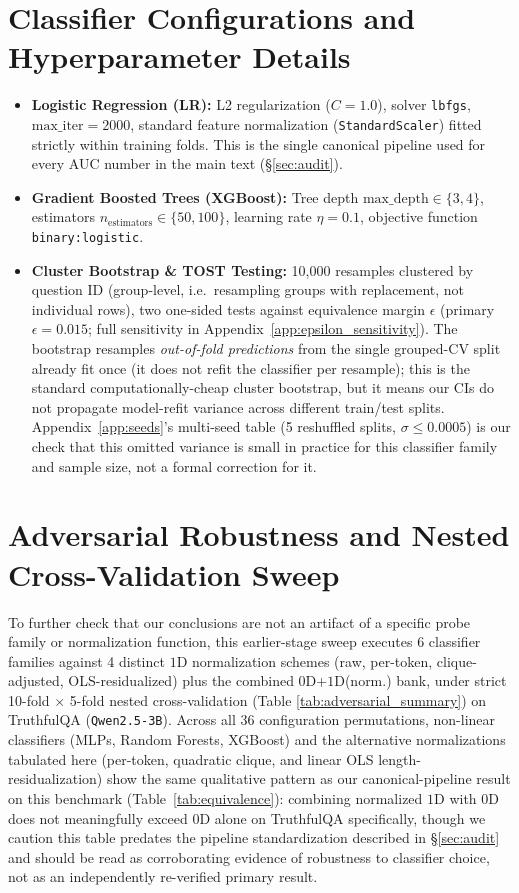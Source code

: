 \documentclass{article}
\begin{document}
\section{Classifier Configurations and Hyperparameter Details}
\label{app:hyperparams}
\begin{itemize}
    \item \textbf{Logistic Regression (LR):} L2 regularization ($C = 1.0$), solver \texttt{lbfgs}, $\text{max\_iter} = 2000$, standard feature normalization (\texttt{StandardScaler}) fitted strictly within training folds. This is the single canonical pipeline used for every AUC number in the main text (\S\ref{sec:audit}).
    \item \textbf{Gradient Boosted Trees (XGBoost):} Tree depth $\text{max\_depth} \in \{3, 4\}$, estimators $n_{\text{estimators}} \in \{50, 100\}$, learning rate $\eta = 0.1$, objective function \texttt{binary:logistic}.
    \item \textbf{Cluster Bootstrap \& TOST Testing:} 10,000 resamples clustered by question ID (group-level, i.e.\ resampling groups with replacement, not individual rows), two one-sided tests against equivalence margin $\epsilon$ (primary $\epsilon=0.015$; full sensitivity in Appendix~\ref{app:epsilon_sensitivity}). The bootstrap resamples \emph{out-of-fold predictions} from the single grouped-CV split already fit once (it does not refit the classifier per resample); this is the standard computationally-cheap cluster bootstrap, but it means our CIs do not propagate model-refit variance across different train/test splits. Appendix~\ref{app:seeds}'s multi-seed table (5 reshuffled splits, $\sigma\le0.0005$) is our check that this omitted variance is small in practice for this classifier family and sample size, not a formal correction for it.
\end{itemize}

\section{Adversarial Robustness and Nested Cross-Validation Sweep}
\label{app:adversarial}
To further check that our conclusions are not an artifact of a specific probe family or normalization function, this earlier-stage sweep executes 6 classifier families against 4 distinct $1$D normalization schemes (raw, per-token, clique-adjusted, OLS-residualized) plus the combined $0$D+$1$D(norm.) bank, under strict 10-fold $\times$ 5-fold nested cross-validation (Table \ref{tab:adversarial_summary}) on TruthfulQA (\texttt{Qwen2.5-3B}). Across all 36 configuration permutations, non-linear classifiers (MLPs, Random Forests, XGBoost) and the alternative normalizations tabulated here (per-token, quadratic clique, and linear OLS length-residualization) show the same qualitative pattern as our canonical-pipeline result on this benchmark (Table~\ref{tab:equivalence}): combining normalized $1$D with $0$D does not meaningfully exceed $0$D alone on TruthfulQA specifically, though we caution this table predates the pipeline standardization described in \S\ref{sec:audit} and should be read as corroborating evidence of robustness to classifier choice, not as an independently re-verified primary result.
\end{document}
